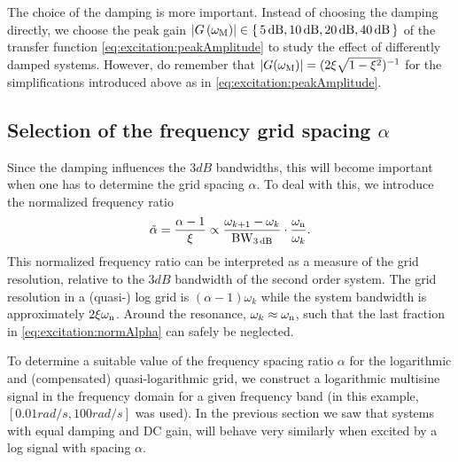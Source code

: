 
  The choice of the damping is more important.
  Instead of choosing the damping directly, we choose the peak gain $\left| G\left( \omega_{\mathrm{M}} \right) \right| \in \set{5 \ensuremath{\,\mathrm{dB}}, 10 \ensuremath{\,\mathrm{dB}}, 20 \ensuremath{\,\mathrm{dB}}, 40 \ensuremath{\,\mathrm{dB}} }$ of the transfer function \eqref{eq:excitation:peakAmplitude} to study the effect of differently damped systems.
  However, do remember that $\left| G(\omega_{\mathrm{M}}) \right| = (2\xi_{}\sqrt{1-\xi_{}^2})^{-1}$ for the simplifications introduced above as in \eqref{eq:excitation:peakAmplitude}.

  \subsection{Selection of the frequency grid spacing $\alpha$}
  Since the damping influences the $3\unit{dB}$ bandwidths, this will become important when one has to determine the grid spacing $\alpha$.
  To deal with this, we introduce the normalized frequency ratio
  \begin{equation}
    \tilde{\alpha} = \frac{\alpha - 1}
                          {\xi_{}}
                   \propto \frac{\omega_{k+1} - \omega_k}
                                {\mathrm{BW}_{3\,\mathrm{dB}}}
                           \cdot
                           \frac{\omega_{\mathrm{n}}}{\omega_k}
    \text{.}
    \label{eq:excitation:normAlpha} 
  \end{equation}
  This normalized frequency ratio can be interpreted as a measure of the grid resolution, relative to the $3\unit{dB}$ bandwidth of the second order system.
  The grid resolution in a (quasi-) log grid is $\left( \alpha - 1\right)\omega_k$ while the system bandwidth is approximately $2\xi_{}\omega_{\mathrm{n}}$.
  Around the resonance, $\omega_k \approx \omega_{\mathrm{n}}$, such that the last fraction in \eqref{eq:excitation:normAlpha} can safely be neglected.
  
  To determine a suitable value of the frequency spacing ratio $\alpha$ for the logarithmic and (compensated) quasi-logarithmic grid, we construct a logarithmic multisine signal in the frequency domain for a given frequency band (in this example, $\left[ 0.01 \unit{rad/s}, 100 \unit{rad/s}\right]$ was used).
  In the previous section we saw that systems with equal damping and \gls{DC} gain, will behave very similarly when excited by a log signal with spacing $\alpha$.

